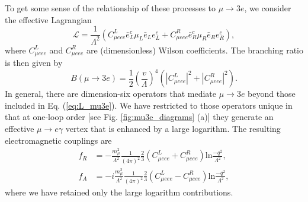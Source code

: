 \documentclass{book}[letterpaper,12pt]
\begin{document}
To get some sense of the relationship of these processes to $\mu\rightarrow 3e$, we consider the effective Lagrangian
\begin{equation}
\mathcal{L}=\frac{1}{\Lambda^2}\left(C_{\mu eee}^L\bar{e}^c_L\mu_L\bar{e}_Le^c_L+C^R_{\mu eee}\bar{e}^c_R\mu_R\bar{e}_Re^c_R\right),
\label{eq:L_mu3e}
\end{equation}
where $C^L_{\mu eee}$ and $C^R_{\mu eee}$ are (dimensionless) Wilson coefficients. The branching ratio is then given by
\begin{equation}
B(\mu\rightarrow 3e)=\frac{1}{2}\left(\frac{v}{\Lambda}\right)^4\left(|C^L_{\mu eee}|^2+|C^R_{\mu eee}|^2\right).
\end{equation}
In general, there are dimension-six operators that mediate $\mu\rightarrow 3e$ beyond those included in Eq. (\ref{eq:L_mu3e}). We have restricted to those operators unique in that at one-loop order [see Fig. \ref{fig:mu3e_diagrams} (a)] they generate an effective $\mu\rightarrow e\gamma$ vertex that is enhanced by a large logarithm. The resulting electromagnetic couplings are \cite{Raidal:1997hq,Cirigliano:2004mv,PhysRevLett.93.231802}
\begin{equation}
\begin{split}
f_R&=-\frac{m_{\mu}^2}{\Lambda^2}\frac{1}{(4\pi)^2}\frac{2}{3}\left(C^L_{\mu eee}+C^R_{\mu eee}\right)\mathrm{ln}\frac{-q^2}{\Lambda^2},\\
f_A&=-i\frac{m_{\mu}^2}{\Lambda^2}\frac{1}{(4\pi)^2}\frac{2}{3}\left(C^L_{\mu eee}-C^R_{\mu eee}\right)\mathrm{ln}\frac{-q^2}{\Lambda^2},
\end{split}
\end{equation}
where we have retained only the large logarithm contributions.
\end{document}
